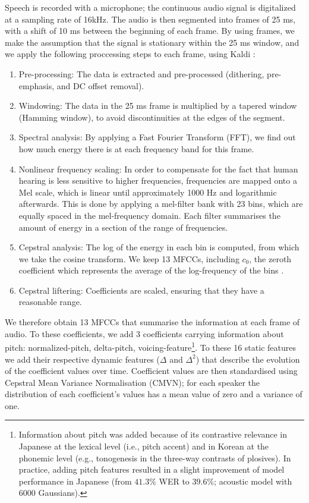 Speech is recorded with a microphone; the continuous audio signal is digitalized at a sampling rate of 16kHz.
The audio is then segmented into frames of 25 ms, with a shift of 10 ms between the beginning of each frame. By using frames, we make the assumption that the signal is stationary within the 25 ms window, and we apply the following proccessing steps to each frame, using Kaldi \cite{povey2011}:

\begin{enumerate}
\item Pre-processing: The data is extracted and pre-processed (dithering, pre-emphasis, and DC offset removal).
\item Windowing: The data in the 25 ms frame is multiplied by a tapered window (Hamming window), to avoid discontinuities at the edges of the segment.
\item Spectral analysis: By applying a Fast Fourier Transform (FFT), we find out how much energy there is at each frequency band for this frame.
\item Nonlinear frequency scaling: In order to compensate for the fact that human hearing is less sensitive to higher frequencies, frequencies are mapped onto a Mel scale, which is linear until approximately 1000 Hz and logarithmic afterwards. This is done by applying a mel-filter bank with 23 bins, which are equally spaced in the mel-frequency domain. Each filter summarises the amount of energy in a section of the range of frequencies. %
\item Cepstral analysis: The log of the energy in each bin is computed, from which we take the cosine transform. We keep 13 MFCCs, including $c_{0}$, the zeroth coefficient which represents the average of the log-frequency of the bins \cite{gales2008}.
  \item Cepstral liftering: Coefficients are scaled, ensuring that they have a reasonable range.
\end{enumerate}

We therefore obtain 13 MFCCs that summarise the information at each frame of audio. To these coefficients, we add 3 coefficients carrying information about pitch: normalized-pitch, delta-pitch, voicing-feature\footnote{Information about pitch was added because of its contrastive relevance in Japanese at the lexical level (i.e., pitch accent) and in Korean at the phonemic level (e.g., tonogenesis in the three-way contrasts of plosives). In practice, adding pitch features resulted in a slight improvement of model performance in Japanese (from $41.3\%$ WER to $39.6\%$; acoustic model with 6000 Gaussians).}.
To these 16 static features we add their respective dynamic features ($\Delta$ and $\Delta^2$) that describe the evolution of the coefficient values over time. 
Coefficient values are then standardised using Cepstral Mean Variance Normalisation (CMVN); for each speaker the distribution of each coefficient's values has a mean value of zero and a variance of one. 

